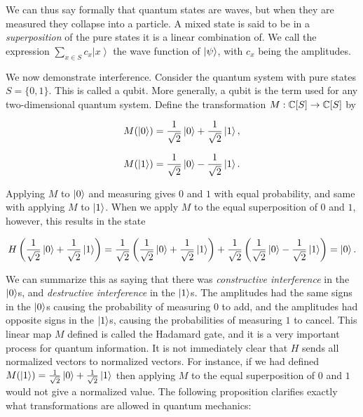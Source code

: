 \documentclass{article}
\theoremstyle{definition}
\numberwithin{figure}{section}
\begin{document}
We can thus say formally that quantum states are waves, but when they are measured they collapse into a particle. A mixed state is said to be in a \textit{superposition} of the pure states it is a linear combination of. We call the expression $\sum_{x\in S}c_x \left|x\right>$ the wave function of $\left|\psi\right>$, with $c_x$ being the amplitudes.

We now demonstrate interference. Consider the quantum system with pure states $S=\{0,1\}$. This is called a qubit. More generally, a qubit is the term used for any two-dimensional quantum system. Define the transformation $M: \mathbb{C}[S]\to \mathbb{C}[S]$ by

$$M(\left|0\right>)=\frac{1}{\sqrt{2}}\left|0\right>+\frac{1}{\sqrt{2}}\left|1\right>,$$

$$M(\left|1\right>)=\frac{1}{\sqrt{2}}\left|0\right>-\frac{1}{\sqrt{2}}\left|1\right>.$$

Applying $M$ to $\left|0\right>$ and measuring gives $0$ and $1$ with equal probability, and same with applying $M$ to $\left|1\right>$. When we apply $M$ to the equal superposition of $0$ and $1$, however, this results in the state

$$H\left(\frac{1}{\sqrt{2}}\left|0\right>+\frac{1}{\sqrt{2}}\left|1\right>\right)=\frac{1}{\sqrt{2}}\left(\frac{1}{\sqrt{2}}\left|0\right>+\frac{1}{\sqrt{2}}\left|1\right>\right)+\frac{1}{\sqrt{2}}\left(\frac{1}{\sqrt{2}}\left|0\right>-\frac{1}{\sqrt{2}}\left|1\right>\right)=\left|0\right>.$$

We can summarize this as saying that there was \textit{constructive interference} in the $\left|0\right>$s, and \textit{destructive interference} in the $\left|1\right>$s. The amplitudes had the same signs in the $\left|0\right>$s causing the probability of measuring $0$ to add, and the amplitudes had opposite signs in the $\left|1\right>$s, causing the probabilities of measuring $1$ to cancel. This linear map $M$ defined is called the Hadamard gate, and it is a very important process for quantum information. It is not immediately clear that $H$ sends all normalized vectors to normalized vectors. For instance, if we had defined $M(\left|1\right>)=\frac{1}{\sqrt{2}}\left|0\right>+\frac{1}{\sqrt{2}}\left|1\right>$ then applying $M$ to the equal superposition of $0$ and $1$ would not give a normalized value. The following proposition clarifies exactly what transformations are allowed in quantum mechanics:
\end{document}
